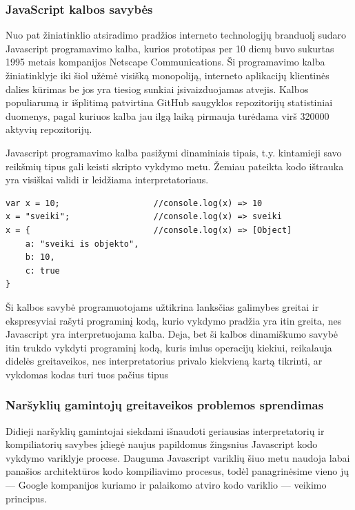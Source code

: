 \documentclass{VUMIFPSkursinis}
\begin{document}
\subsubsection{JavaScript kalbos savybės}

Nuo pat žiniatinklio atsiradimo pradžios interneto technologijų branduolį sudaro Javascript programavimo kalba, kurios prototipas per 10 dienų buvo sukurtas 1995 metais kompanijos Netscape Communications. Ši programavimo kalba žiniatinklyje iki šiol užėmė visišką monopoliją, interneto aplikacijų klientinės dalies kūrimas be jos yra tiesiog sunkiai įsivaizduojamas atvejis. Kalbos populiarumą ir išplitimą patvirtina GitHub saugyklos repozitorijų statistiniai duomenys, pagal kuriuos kalba jau ilgą laiką pirmauja turėdama virš 320000 aktyvių repozitorijų. 


Javascript programavimo kalba pasižymi dinaminiais tipais, t.y. kintamieji savo reikšmių tipus gali keisti skripto vykdymo metu. Žemiau pateikta kodo ištrauka yra visiškai validi ir leidžiama interpretatoriaus.

\begin{center}
\begin{small}
\begin{verbatim}
var x = 10;                   //console.log(x) => 10
x = "sveiki";                 //console.log(x) => sveiki
x = {                         //console.log(x) => [Object]
    a: "sveiki is objekto",
    b: 10,
    c: true
}
\end{verbatim}
\end{small}
\end{center}

Ši kalbos savybė programuotojams užtikrina lanksčias galimybes greitai ir ekspresyviai rašyti programinį kodą, kurio vykdymo pradžia yra itin greita, nes Javascript yra interpretuojama kalba. Deja, bet ši kalbos dinamiškumo savybė itin trukdo vykdyti programinį kodą, kuris imlus operacijų kiekiui, reikalauja didelės greitaveikos, nes interpretatorius privalo kiekvieną kartą tikrinti, ar vykdomas kodas turi tuos pačius tipus 

\subsubsection{Naršyklių gamintojų greitaveikos problemos sprendimas}

Didieji naršyklių gamintojai siekdami išnaudoti geriausias interpretatorių ir kompiliatorių savybes įdiegė naujus papildomus žingsnius Javascript kodo vykdymo variklyje procese. Dauguma Javascript variklių šiuo metu naudoja labai panašios architektūros kodo kompiliavimo procesus, todėl panagrinėsime vieno jų — Google kompanijos kuriamo ir palaikomo atviro kodo variklio — veikimo principus.
\end{document}
